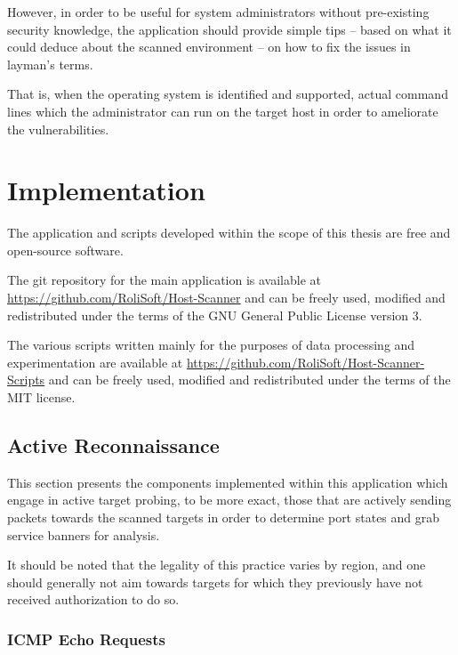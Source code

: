 \documentclass[a4paper,12pt]{article}
\begin{document}
	However, in order to be useful for system administrators without pre-existing security knowledge, the application should provide simple tips -- based on what it could deduce about the scanned environment -- on how to fix the issues in layman's terms.
	
	That is, when the operating system is identified and supported, actual command lines which the administrator can run on the target host in order to ameliorate the vulnerabilities.
	
\section{Implementation} \label{impl}
 

	The application and scripts developed within the scope of this thesis are free and open-source software.
	
	The git repository for the main application is available at \url{https://github.com/RoliSoft/Host-Scanner} and can be freely used, modified and redistributed under the terms of the GNU General Public License version 3\cite{gplv3}.
		
	The various scripts written mainly for the purposes of data processing and experimentation are available at \url{https://github.com/RoliSoft/Host-Scanner-Scripts} and can be freely used, modified and redistributed under the terms of the MIT license\cite{mit}.

\subsection{Active Reconnaissance}
 

	This section presents the components implemented within this application which engage in active target probing, to be more exact, those that are actively sending packets towards the scanned targets in order to determine port states and grab service banners for analysis.
	
	It should be noted that the legality of this practice varies by region, and one should generally not aim towards targets for which they previously have not received authorization to do so.

\subsubsection{ICMP Echo Requests} \label{icmpping}
 
\end{document}
